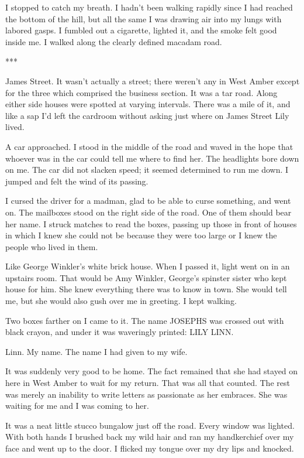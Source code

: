 {I stopped to catch my breath. I hadn’t been walking rapidly since I had reached the bottom of the hill, but all the same I was drawing air into my lungs with labored gasps. I fumbled out a cigarette, lighted it, and the smoke felt good inside me. I walked along the clearly defined macadam road.

***

James Street. It wasn’t actually a street; there weren’t any in West Amber except for the three which comprised the business section. It was a tar road. Along either side houses were spotted at varying intervals. There was a mile of it, and like a sap I’d left the cardroom without asking just where on James Street Lily lived.

A car approached. I stood in the middle of the road and waved in the hope that whoever was in the car could tell me where to find her. The headlights bore down on me. The car did not slacken speed; it seemed determined to run me down. I jumped and felt the wind of its passing.

I cursed the driver for a madman, glad to be able to curse something, and went on. The mailboxes stood on the right side of the road. One of them should bear her name. I struck matches to read the boxes, passing up those in front of houses in which I knew she could not be because they were too large or I knew the people who lived in them.

Like George Winkler’s white brick house. When I passed it, light went on in an upstairs room. That would be Amy Winkler, George’s spinster sister who kept house for him. She knew everything there was to know in town. She would tell me, but she would also gush over me in greeting. I kept walking.

Two boxes farther on I came to it. The name JOSEPHS was crossed out with black crayon, and under it was waveringly printed: LILY LINN.

Linn. My name. The name I had given to my wife.

It was suddenly very good to be home. The fact remained that she had stayed on here in West Amber to wait for my return. That was all that counted. The rest was merely an inability to write letters as passionate as her embraces. She was waiting for me and I was coming to her.

It was a neat little stucco bungalow just off the road. Every window was lighted. With both hands I brushed back my wild hair and ran my handkerchief over my face and went up to the door. I flicked my tongue over my dry lips and knocked.

}
